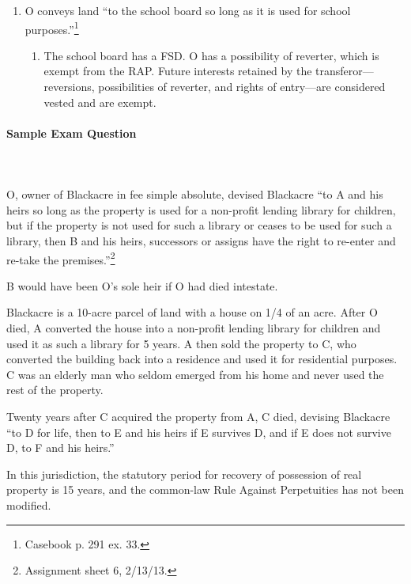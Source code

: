 \begin{enumerate}
{    problem 4). See reader p. 74.}
    \begin{enumerate}
        \item Yes. B has a vested remainder in fee simple absolute. The RAP 
        only applies to non-vested interests.
    \end{enumerate}
    \item O conveys land ``to the school board so long as it is used for 
    school purposes.''\footnote{Casebook p. 291 ex. 33.}
    \begin{enumerate}
        \item The school board has a FSD. O has a possibility of reverter, 
        which is exempt from the RAP. Future interests retained by the 
        transferor---reversions, possibilities of reverter, and rights of 
        entry---are considered vested and are exempt.
    \end{enumerate}
\end{enumerate}

\paragraph{Sample Exam Question}
~\\\\
O, owner of Blackacre in fee simple absolute, devised Blackacre ``to A and his 
heirs so long as the property is used for a non-profit lending library for 
children, but if the property is not used for such a library or ceases to be 
used for such a library, then B and his heirs, successors or assigns have the 
right to re-enter and re-take the premises.''\footnote{Assignment sheet 6, 
2/13/13.}

B would have been O's sole heir if O had died intestate.

Blackacre is a 10-acre parcel of land with a house on 1/4 of an acre. After O 
died, A converted the house into a non-profit lending library for children and 
used it as such a library for 5 years. A then sold the property to C, who 
converted the building back into a residence and used it for residential 
purposes. C was an elderly man who seldom emerged from his home and never used 
the rest of the property.

Twenty years after C acquired the property from A, C died, devising Blackacre 
``to D for life, then to E and his heirs if E survives D, and if E does not 
survive D, to F and his heirs.''

In this jurisdiction, the statutory period for recovery of possession of real 
property is 15 years, and the common-law Rule Against Perpetuities has not 
been modified.


